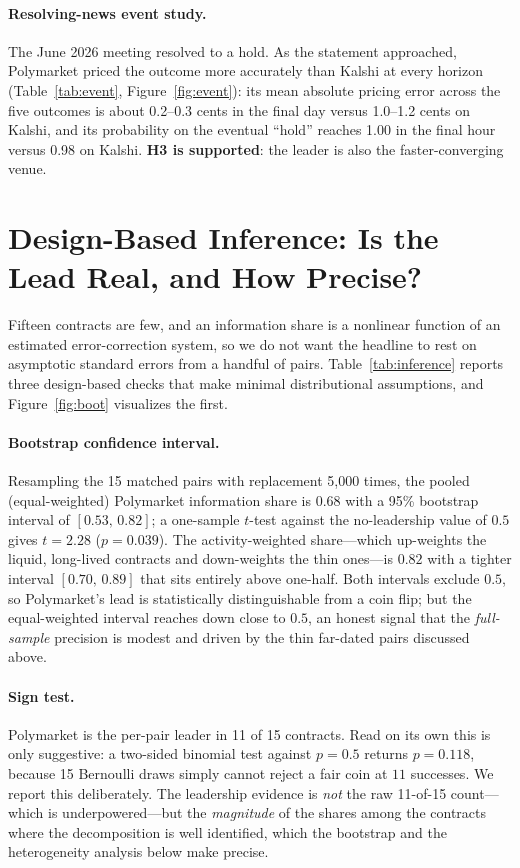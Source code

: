 \documentclass[12pt]{article}
\begin{document}
\paragraph{Resolving-news event study.} The June 2026 meeting resolved to a hold. As the
statement approached, Polymarket priced the outcome more accurately than Kalshi at every
horizon (Table~\ref{tab:event}, Figure~\ref{fig:event}): its mean absolute pricing error
across the five outcomes is about 0.2--0.3 cents in the final day versus 1.0--1.2 cents on
Kalshi, and its probability on the eventual ``hold'' reaches 1.00 in the final hour versus
0.98 on Kalshi. \textbf{H3 is supported}: the leader is also the faster-converging venue.

\section{Design-Based Inference: Is the Lead Real, and How Precise?}\label{sec:inf}
Fifteen contracts are few, and an information share is a nonlinear function of an estimated
error-correction system, so we do not want the headline to rest on asymptotic standard errors
from a handful of pairs. Table~\ref{tab:inference} reports three design-based checks that make
minimal distributional assumptions, and Figure~\ref{fig:boot} visualizes the first.

\paragraph{Bootstrap confidence interval.} Resampling the 15 matched pairs with replacement
5{,}000 times, the pooled (equal-weighted) Polymarket information share is $0.68$ with a 95\%
bootstrap interval of $[0.53,\,0.82]$; a one-sample $t$-test against the no-leadership value of
$0.5$ gives $t=2.28$ ($p=0.039$). The activity-weighted share---which up-weights the liquid,
long-lived contracts and down-weights the thin ones---is $0.82$ with a tighter interval
$[0.70,\,0.89]$ that sits entirely above one-half. Both intervals exclude $0.5$, so Polymarket's
lead is statistically distinguishable from a coin flip; but the equal-weighted interval reaches
down close to $0.5$, an honest signal that the \emph{full-sample} precision is modest and driven
by the thin far-dated pairs discussed above.

\paragraph{Sign test.} Polymarket is the per-pair leader in 11 of 15 contracts. Read on its own
this is only suggestive: a two-sided binomial test against $p=0.5$ returns $p=0.118$, because 15
Bernoulli draws simply cannot reject a fair coin at $11$ successes. We report this deliberately.
The leadership evidence is \emph{not} the raw 11-of-15 count---which is underpowered---but the
\emph{magnitude} of the shares among the contracts where the decomposition is well identified,
which the bootstrap and the heterogeneity analysis below make precise.
\end{document}
